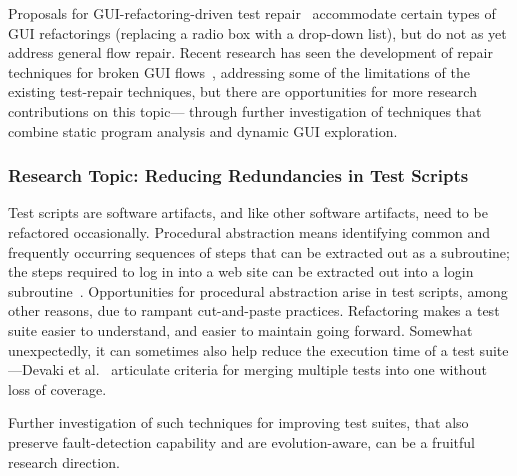 
Proposals for GUI-refactoring-driven test repair~\cite{Daniel2011} accommodate
certain types of GUI refactorings (\eg replacing a radio box with a drop-down
list), but do not as yet address general flow repair.  Recent research has seen
the development of repair techniques for broken GUI flows~\cite{Zhang2013},
addressing some of the limitations of the existing test-repair techniques, but
there are opportunities for more research contributions on this topic---\eg
through further investigation of techniques that combine static program analysis
and dynamic GUI exploration.

\vskip -5pt
\subsubsection*{Research Topic: Reducing Redundancies in Test Scripts}

Test scripts are software artifacts, and like other software artifacts, need to
be refactored occasionally.  Procedural abstraction means identifying common and
frequently occurring sequences of steps that can be extracted out as a
subroutine; \eg the steps required to log in into a web site can be extracted
out into a login subroutine~\cite{Mahmud:2010}.  Opportunities for procedural
abstraction arise in test scripts, among other reasons, due to rampant
cut-and-paste practices.  Refactoring makes a test suite easier to understand,
and easier to maintain going forward.  Somewhat unexpectedly, it can sometimes
also help reduce the execution time of a test suite---\eg Devaki et
al.~\cite{Devaki:2013} articulate criteria for merging multiple tests into one
without loss of coverage.

Further investigation of such techniques for improving test suites, that also
preserve fault-detection capability and are evolution-aware, can be a fruitful
research direction.

